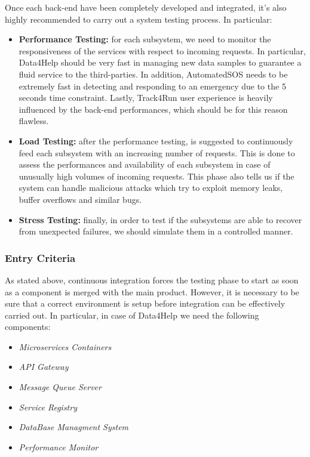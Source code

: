 Once each back-end have been completely developed and integrated, it's also highly recommended to carry out a system testing process. In particular:

\begin{itemize}
    \item \textbf{Performance Testing:} for each subsystem, we need to monitor the responsiveness of the services with respect to incoming requests. In particular, Data4Help should be very fast in managing new data samples to guarantee a fluid service to the third-parties. In addition, AutomatedSOS needs to be extremely fast in detecting and responding to an emergency due to the 5 seconds time constraint. Lastly, Track4Run user experience is heavily influenced by the back-end performances, which should be for this reason flawless.
    \item \textbf{Load Testing:} after the performance testing, is suggested to continuously feed each subsystem with an increasing number of requests. This is done to assess the performances and availability of each subsystem in case of unusually high volumes of incoming requests. This phase also tells us if the system can handle malicious attacks which try to exploit memory leaks, buffer overflows and similar bugs.  
    \item \textbf{Stress Testing:} finally, in order to test if the subsystems are able to recover from unexpected failures, we should simulate them in a controlled manner.
\end{itemize}

\subsubsection{Entry Criteria}
As stated above, continuous integration forces the testing phase to start as soon as a component is merged with the main product. However, it is necessary to be sure that a correct environment is setup before integration can be effectively carried out. In particular, in case of Data4Help we need the following components:

\begin{itemize}
    \item \textit{Microservices Containers}
    \item \textit{API Gateway}
    \item \textit{Message Queue Server}
    \item \textit{Service Registry}
    \item \textit{DataBase Managment System}
    \item \textit{Performance Monitor}
\end{itemize}

